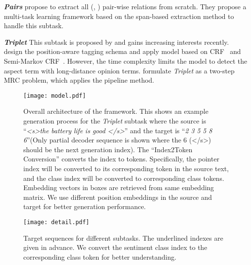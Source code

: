 \documentclass[11pt,a4paper]{article}
\begin{document}
\textbf{\emph{Pairs}} \citet{DBLP:conf/acl/ZhaoHZLX20}  propose to extract all (, )  pair-wise relations from scratch. They propose a multi-task learning framework based on the span-based extraction method  to handle this subtask.

\textbf{\emph{Triplet}} This subtask is proposed by \citet{DBLP:conf/aaai/PengXBHLS20}  and gains increasing interests recently. \citet{DBLP:conf/emnlp/XuLLB20} design the position-aware tagging schema and apply model based on CRF~\citep{DBLP:conf/icml/LaffertyMP01} and Semi-Markov CRF~\citep{DBLP:conf/nips/SarawagiC04}. However, the time complexity limits the model to detect the aspect term with  long-distance opinion terms.  \citet{DBLP:journals/corr/abs-2101-00816} formulate \emph{Triplet} as a two-step MRC problem, which applies the pipeline method.

\begin{figure*}[t!]
  \texttt{[image: model.pdf]}
  \caption{Overall architecture of the framework. This shows an example generation process for the \emph{Triplet} subtask where the source is ``\emph{\textless{}s\textgreater the battery life is good \textless{}/s\textgreater}'' and the target is ``\emph{2 3 5 5 8 6}''(Only partial decoder sequence is shown where the 6 (\textless{}/s\textgreater) should be the next  generation index). The ``Index2Token Conversion'' converts the index to tokens. Specifically, the pointer index will be converted to its corresponding token in the source text, and the class index will be converted to corresponding class tokens. Embedding vectors in \colorbox[RGB]{252,227,138}{\color[RGB]{252,227,138}{ll}} boxes are retrieved from same embedding matrix. We use different position embeddings in the source and target for better generation performance. }
  \label{fig:model}
\end{figure*}

\begin{figure}[h]
  \texttt{[image: detail.pdf]}
  \caption{Target sequences for different subtasks. The underlined indexes are given in advance. We convert the sentiment class index to the corresponding class token for better understanding.}\label{fig:detail}
\end{figure}
\end{document}
